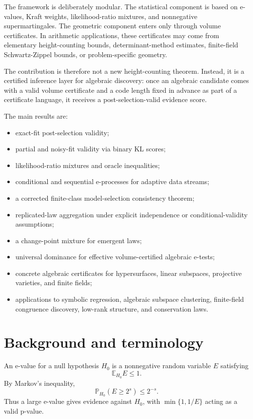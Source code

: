 \documentclass[11pt]{article}
\begin{document}
The framework is deliberately modular. The statistical component is based on e-values, Kraft weights, likelihood-ratio mixtures, and nonnegative supermartingales. The geometric component enters only through volume certificates. In arithmetic applications, these certificates may come from elementary height-counting bounds, determinant-method estimates, finite-field Schwartz-Zippel bounds, or problem-specific geometry.

The contribution is therefore not a new height-counting theorem. Instead, it is a certified inference layer for algebraic discovery: once an algebraic candidate comes with a valid volume certificate and a code length fixed in advance as part of a certificate language, it receives a post-selection-valid evidence score.

The main results are:
\begin{itemize}
\item exact-fit post-selection validity;
\item partial and noisy-fit validity via binary KL scores;
\item likelihood-ratio mixtures and oracle inequalities;
\item conditional and sequential e-processes for adaptive data streams;
\item a corrected finite-class model-selection consistency theorem;
\item replicated-law aggregation under explicit independence or conditional-validity assumptions;
\item a change-point mixture for emergent laws;
\item universal dominance for effective volume-certified algebraic e-tests;
\item concrete algebraic certificates for hypersurfaces, linear subspaces, projective varieties, and finite fields;
\item applications to symbolic regression, algebraic subspace clustering, finite-field congruence discovery, low-rank structure, and conservation laws.
\end{itemize}

\section{Background and terminology}

An e-value for a null hypothesis $H_0$ is a nonnegative random variable $E$ satisfying
\[
\mathbb E_{H_0}E\le1.
\]
By Markov's inequality,
\[
\mathbb P_{H_0}(E\ge 2^s)\le2^{-s}.
\]
Thus a large e-value gives evidence against $H_0$, with $\min\{1,1/E\}$ acting as a valid p-value.
\end{document}
